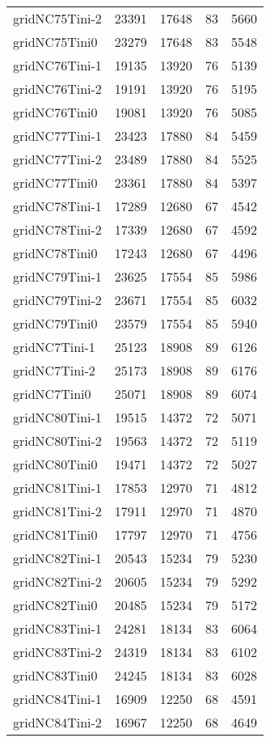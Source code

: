 \begin{tabular}{lrrrr}
gridNC75Tini-2 & 23391 & 17648 & 83 & 5660 \\
gridNC75Tini0 & 23279 & 17648 & 83 & 5548 \\
gridNC76Tini-1 & 19135 & 13920 & 76 & 5139 \\
gridNC76Tini-2 & 19191 & 13920 & 76 & 5195 \\
gridNC76Tini0 & 19081 & 13920 & 76 & 5085 \\
gridNC77Tini-1 & 23423 & 17880 & 84 & 5459 \\
gridNC77Tini-2 & 23489 & 17880 & 84 & 5525 \\
gridNC77Tini0 & 23361 & 17880 & 84 & 5397 \\
gridNC78Tini-1 & 17289 & 12680 & 67 & 4542 \\
gridNC78Tini-2 & 17339 & 12680 & 67 & 4592 \\
gridNC78Tini0 & 17243 & 12680 & 67 & 4496 \\
gridNC79Tini-1 & 23625 & 17554 & 85 & 5986 \\
gridNC79Tini-2 & 23671 & 17554 & 85 & 6032 \\
gridNC79Tini0 & 23579 & 17554 & 85 & 5940 \\
gridNC7Tini-1 & 25123 & 18908 & 89 & 6126 \\
gridNC7Tini-2 & 25173 & 18908 & 89 & 6176 \\
gridNC7Tini0 & 25071 & 18908 & 89 & 6074 \\
gridNC80Tini-1 & 19515 & 14372 & 72 & 5071 \\
gridNC80Tini-2 & 19563 & 14372 & 72 & 5119 \\
gridNC80Tini0 & 19471 & 14372 & 72 & 5027 \\
gridNC81Tini-1 & 17853 & 12970 & 71 & 4812 \\
gridNC81Tini-2 & 17911 & 12970 & 71 & 4870 \\
gridNC81Tini0 & 17797 & 12970 & 71 & 4756 \\
gridNC82Tini-1 & 20543 & 15234 & 79 & 5230 \\
gridNC82Tini-2 & 20605 & 15234 & 79 & 5292 \\
gridNC82Tini0 & 20485 & 15234 & 79 & 5172 \\
gridNC83Tini-1 & 24281 & 18134 & 83 & 6064 \\
gridNC83Tini-2 & 24319 & 18134 & 83 & 6102 \\
gridNC83Tini0 & 24245 & 18134 & 83 & 6028 \\
gridNC84Tini-1 & 16909 & 12250 & 68 & 4591 \\
gridNC84Tini-2 & 16967 & 12250 & 68 & 4649 \\

\end{tabular}
